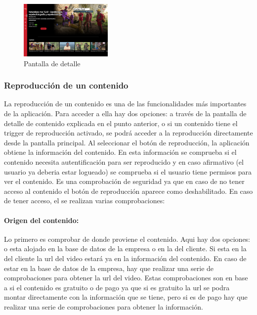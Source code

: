 \begin{figure}[H]
    \includegraphics[width=0.4\textwidth]{imaxes/OTT/Pantalla_detalle_contenido.png}
    \caption{Pantalla de detalle}
\end{figure}

\subsubsection{Reproducción de un contenido}
\label{sec:reproduccion_contenido}

La reproducción de un contenido es una de las funcionalidades más importantes de la aplicación. Para acceder a ella hay dos opciones: a través de la pantalla de detalle
de contenido explicada en el punto anterior, o si un contenido tiene el trigger de reproducción activado, se podrá acceder a la reproducción directamente desde la pantalla
principal. Al seleccionar el botón de reproducción, la aplicación obtiene la información del contenido. En esta información se comprueba si el contenido 
necesita autentificación para ser reproducido y en caso afirmativo (el usuario ya deberia estar logueado) se comprueba si el usuario tiene permisos para ver el contenido.
Es una comprobación de seguridad ya que en caso de no tener acceso al contenido el botón de reproducción aparece como deshabilitado. En caso de tener acceso, el 
se realizan varias comprobaciones:

\paragraph{Origen del contenido:} Lo primero es comprobar de donde proviene el contenido. Aqui hay dos opciones: o esta alojado en la base de datos de la empresa o 
en la del cliente. Si esta en la del cliente la url del video estará ya en la información del contenido. En caso de estar en la base de datos de la empresa, hay que 
realizar una serie de comprobaciones para obtener la url del video. Estas comprobaciones son en base a si el contenido es gratuito o de pago ya que si es
gratuito la url se podra montar directamente con la información que se tiene, pero si es de pago hay que realizar una serie de comprobaciones para obtener la información.

